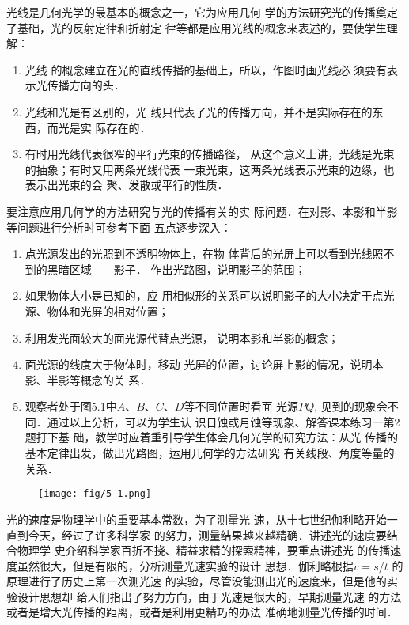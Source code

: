 光线是几何光学的最基本的概念之一，它为应用几何
学的方法研究光的传播奠定了基础，光的反射定律和折射定
律等都是应用光线的概念来表述的，要使学生理解：
\begin{enumerate}
\item 光线
的概念建立在光的直线传播的基础上，所以，作图时画光线必
须要有表示光传播方向的头．    
\item 光线和光是有区别的，光
线只代表了光的传播方向，并不是实际存在的东西，而光是实
际存在的．    
\item 有时用光线代表很窄的平行光束的传播路径，
从这个意义上讲，光线是光束的抽象；有时又用两条光线代表
一束光束，这两条光线表示光束的边缘，也表示出光束的会
聚、发散或平行的性质．
\end{enumerate}

要注意应用几何学的方法研究与光的传播有关的实
际问题．在对影、本影和半影等问题进行分析时可参考下面
五点逐步深入：
\begin{enumerate}

\item 点光源发出的光照到不透明物体上，在物
体背后的光屏上可以看到光线照不到的黑暗区域——影子．
作出光路图，说明影子的范围；
\item 如果物体大小是已知的，应
用相似形的关系可以说明影子的大小决定于点光源、物体和光屏的相对位置；\item 利用发光面较大的面光源代替点光源，
说明本影和半影的概念；
\item 面光源的线度大于物体时，移动
光屏的位置，讨论屏上影的情况，说明本影、半影等概念的关
系．
\item 观察者处于图5.1中$A$、$B$、$C$、$D$等不同位置时看面
光源$PQ$, 见到的现象会不同．通过以上分析，可以为学生认
识日蚀或月蚀等现象、解答课本练习一第2题打下基
础，教学时应着重引导学生体会几何光学的研究方法：从光
传播的基本定律出发，做出光路图，运用几何学的方法研究
有关线段、角度等量的关系．
\end{enumerate}

\begin{figure}[htp]
    \centering
    \texttt{[image: fig/5-1.png]}
    \caption{}
\end{figure}

光的速度是物理学中的重要基本常数，为了测量光
速，从十七世纪伽利略开始一直到今天，经过了许多科学家
的努力，测量结果越来越精确．讲述光的速度要结合物理学
史介绍科学家百折不挠、精益求精的探索精神，要重点讲述光
的传播速度虽然很大，但是有限的，分析测量光速实验的设计
思想．伽利略根据$v=s/t$
的原理进行了历史上第一次测光速
的实验，尽管没能测出光的速度来，但是他的实验设计思想却
给人们指出了努力方向，由于光速是很大的，早期测量光速
的方法或者是增大光传播的距离，或者是利用更精巧的办法
准确地测量光传播的时间．

